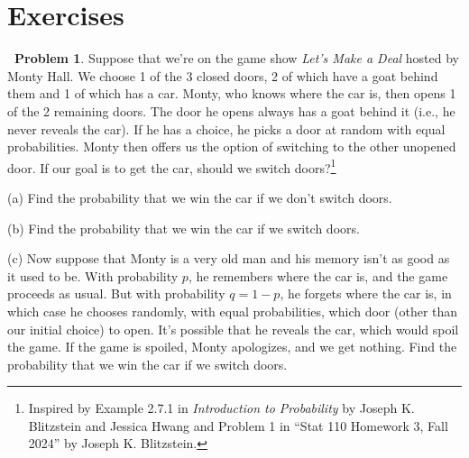 \documentclass[12pt,oneside]{article}
\theoremstyle{definition}
\newtheorem{problem}{\faPen \ Problem}
\theoremstyle{remark}
\begin{document}
\section{Exercises}

\begin{problem}
Suppose that we're on the game show \textit{Let's Make a Deal} hosted by Monty Hall. We choose 1 of the 3 closed doors, 2 of which have a goat behind them and 1 of which has a car. Monty, who knows where the car is, then opens 1 of the 2 remaining doors. The door he opens always has a goat behind it (i.e., he never reveals the car). If he has a choice, he picks a door at random with equal probabilities. Monty then offers us the option of switching to the other unopened door. If our goal is to get the car, should we switch doors?\footnote{Inspired by Example 2.7.1 in \textit{Introduction to Probability} by Joseph K. Blitzstein and Jessica Hwang and Problem 1 in \enquote{Stat 110 Homework 3, Fall 2024} by Joseph K. Blitzstein.}

(a) Find the probability that we win the car if we don't switch doors.

(b) Find the probability that we win the car if we switch doors.

(c) Now suppose that Monty is a very old man and his memory isn’t as good as it used to be. With probability $p$, he remembers where the car is, and the game proceeds as usual. But with probability $q = 1 - p$, he forgets where the car is, in which case he chooses randomly, with equal probabilities, which door (other than our initial choice) to open. It’s possible that he reveals the car, which would spoil the game. If the game is spoiled, Monty apologizes, and we get nothing. Find the probability that we win the car if we switch doors.
\end{problem}
\end{document}
